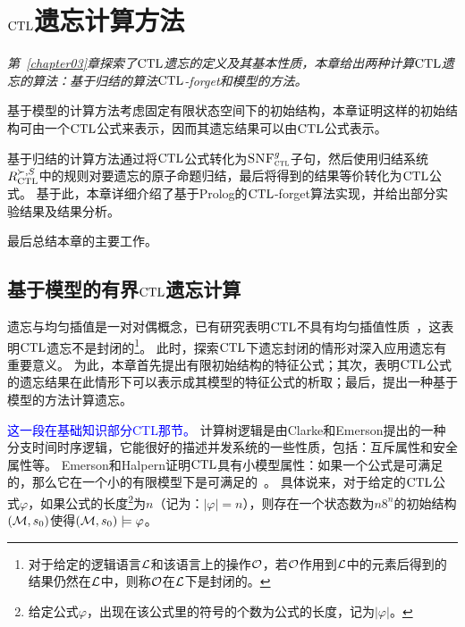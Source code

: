
\chapter{$\textrm{CTL}$遗忘计算方法}
\label{chapter05}
{\em 第~\ref{chapter03}章探索了$\textrm{CTL}$遗忘的定义及其基本性质，本章给出两种计算$\textrm{CTL}$遗忘的算法：基于归结的算法$\textrm{CTL}$-forget和模型的方法。
	
	基于模型的计算方法考虑固定有限状态空间下的初始结构，本章证明这样的初始结构可由一个$\textrm{CTL}$公式来表示，因而其遗忘结果可以由$\textrm{CTL}$公式表示。

基于归结的计算方法通过将$\textrm{CTL}$公式转化为${\textsc{SNF}_{\textsc{ctl}}^g}$子句，然后使用归结系统$R_{\textrm{CTL}}^{\succ,S}$中的规则对要遗忘的原子命题归结，最后将得到的结果等价转化为$\textrm{CTL}$公式。
基于此，本章详细介绍了基于Prolog的$\textrm{CTL}$-forget算法实现，并给出部分实验结果及结果分析。

最后总结本章的主要工作。}

\section{基于模型的有界$\textrm{CTL}$遗忘计算}
\label{chapter05:sec:model}
	遗忘与均匀插值是一对对偶概念，已有研究表明$\textrm{CTL}$不具有均匀插值性质~\cite{Maksimova:JANCL:1991}，这表明$\textrm{CTL}$遗忘不是封闭的\footnote{对于给定的逻辑语言${\cal L}$和该语言上的操作${\cal O}$，若$\cal O$作用到$\cal L$中的元素后得到的结果仍然在$\cal L$中，则称$\cal O$在$\cal L$下是封闭的。}。
	此时，探索$\textrm{CTL}$下遗忘封闭的情形对深入应用遗忘有重要意义。
	为此，本章首先提出有限初始结构的特征公式；其次，表明$\textrm{CTL}$公式的遗忘结果在此情形下可以表示成其模型的特征公式的析取；最后，提出一种基于模型的方法计算遗忘。%



\textcolor{blue}{这一段在基础知识部分CTL那节。} 计算树逻辑是由Clarke和Emerson提出的一种分支时间时序逻辑，它能很好的描述并发系统的一些性质，包括：互斥属性和安全属性等。
Emerson和Halpern证明$\textrm{CTL}$具有小模型属性：如果一个公式是可满足的，那么它在一个小的有限模型下是可满足的~\cite{DBLP:journals/jcss/EmersonH85}。
具体说来，对于给定的$\textrm{CTL}$公式$\varphi$，如果公式的长度\footnote{给定公式$\varphi$，出现在该公式里的符号的个数为公式的长度，记为$|\varphi|$。}为$n$（记为：$|\varphi| = n$），则存在一个状态数为$n8^n$的初始结构$({\cal M},s_0)$使得$({\cal M},s_0)\models \varphi$。

